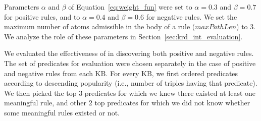 Parameters $\alpha$ and $\beta$ of Equation~\ref{eq:weight_fun} were set to  $\alpha=0.3$ and $\beta=0.7$ for positive rules, and to $\alpha=0.4$ and $\beta=0.6$ for negative rules. 
We set the maximum number of atoms 
admissible in the body of a rule ($maxPathLen$) to $3$.
We analyze the role of these parameters in Section~\ref{sec:krd_int_evaluation}. 

We evaluated the effectiveness of \krd in discovering both positive and negative rules. The set of predicates for evaluation were chosen separately in the case of positive and negative rules from each KB.
For every KB, we first ordered predicates according to descending popularity (i.e., number of triples having that predicate). We then picked the top $3$ predicates for which we knew there existed at least one meaningful rule, and other $2$ top predicates for which we did not know whether some meaningful rules existed or not. 

